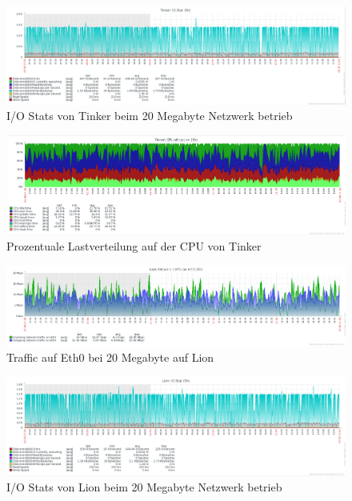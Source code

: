 \begin{figure}[htbp]
\centering
\includegraphics*[width=0.9\linewidth, angle=90]{Abb/ZabbixTinker/Standard/IoStatStandard20}

\caption{I/O Stats von Tinker beim 20 Megabyte Netzwerk betrieb}
\label{fig:IoStatTinkerStandard}
\end{figure} %

\begin{figure}[htbp]
\centering
\includegraphics*[width=0.9\linewidth, angle=90]{Abb/ZabbixTinker/Standard/CPUStandard20}

\caption{Prozentuale Lastverteilung auf der CPU von Tinker}
\label{fig:CPUTinkerStandard}
\end{figure}



\begin{figure}[htbp]
\centering
\includegraphics*[width=0.9\linewidth, angle=90]{Abb/ZabbixLion/Standard/Standard20}

\caption{Traffic auf Eth0 bei 20 Megabyte auf Lion}
\label{fig:Eth0LionStandard}
\end{figure}


\begin{figure}[htbp]
\centering
\includegraphics*[width=0.9\linewidth, angle=90]{Abb/ZabbixLion/Standard/IoStatStandard20}

\caption{I/O Stats von Lion beim 20 Megabyte Netzwerk betrieb}
\label{fig:IoStatLionStandard}
\end{figure} %

